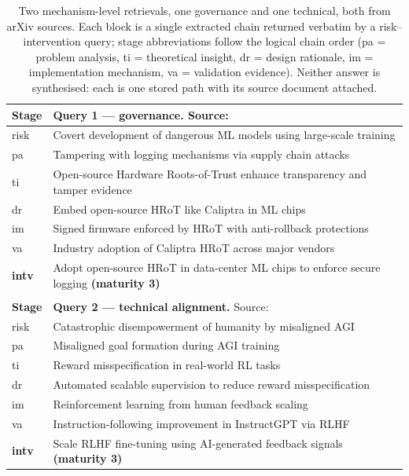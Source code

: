 \documentclass[10pt,twocolumn,letterpaper]{article}
\begin{document}
\begin{table}[t]
\centering
\small
\begin{tabular}{p{}p{}}
\toprule
\textbf{Stage} & \textbf{Query 1 --- governance.} Source: \citet{shavit2023chinchilla} \\
\midrule
risk & Covert development of dangerous ML models using large-scale training \\
pa & Tampering with logging mechanisms via supply chain attacks \\
ti & Open-source Hardware Roots-of-Trust enhance transparency and tamper evidence \\
dr & Embed open-source HRoT like Caliptra in ML chips \\
im & Signed firmware enforced by HRoT with anti-rollback protections \\
va & Industry adoption of Caliptra HRoT across major vendors \\
\textbf{intv} & Adopt open-source HRoT in data-center ML chips to enforce secure logging \textbf{(maturity 3)} \\
\midrule
\multicolumn{2}{c}{} \\
\midrule
\textbf{Stage} & \textbf{Query 2 --- technical alignment.} Source: \citet{ngo2022alignment} \\
\midrule
risk & Catastrophic disempowerment of humanity by misaligned AGI \\
pa & Misaligned goal formation during AGI training \\
ti & Reward misspecification in real-world RL tasks \\
dr & Automated scalable supervision to reduce reward misspecification \\
im & Reinforcement learning from human feedback scaling \\
va & Instruction-following improvement in InstructGPT via RLHF \\
\textbf{intv} & Scale RLHF fine-tuning using AI-generated feedback signals \textbf{(maturity 3)} \\
\bottomrule
\end{tabular}
\caption{Two mechanism-level retrievals, one governance and one technical, both
from arXiv sources. Each block is a single extracted chain returned verbatim by a
risk--intervention query; stage abbreviations follow the logical chain order
(pa = problem analysis, ti = theoretical insight, dr = design rationale,
im = implementation mechanism, va = validation evidence). Neither answer is
synthesised: each is one stored path with its source document attached.}
\label{tab:query}
\end{table}
\end{document}
